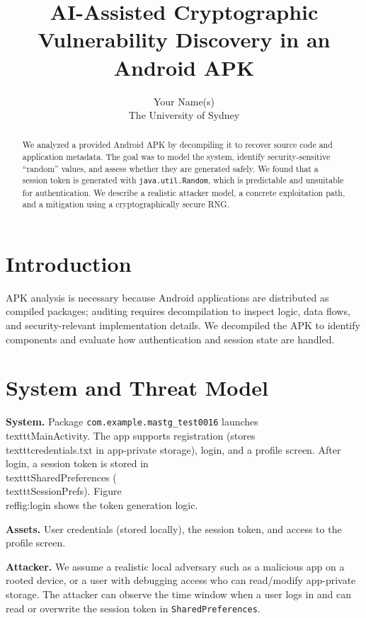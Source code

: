 ﻿\documentclass[letterpaper,twocolumn,10pt]{article}
\title{AI-Assisted Cryptographic Vulnerability Discovery in an Android APK}
\author{
{\rm Your Name(s)}\\
The University of Sydney
}
\date{}
\begin{document}
\maketitle

\begin{abstract}
We analyzed a provided Android APK by decompiling it to recover source code and application metadata. The goal was to model the system, identify security-sensitive ``random'' values, and assess whether they are generated safely. We found that a session token is generated with \texttt{java.util.Random}, which is predictable and unsuitable for authentication. We describe a realistic attacker model, a concrete exploitation path, and a mitigation using a cryptographically secure RNG.
\end{abstract}

\section{Introduction}
APK analysis is necessary because Android applications are distributed as compiled packages; auditing requires decompilation to inspect logic, data flows, and security-relevant implementation details. We decompiled the APK to identify components and evaluate how authentication and session state are handled.

\section{System and Threat Model}
\textbf{System.} Package \texttt{com.example.\allowbreak mastg\_test0016} launches \\texttt{MainActivity}. The app supports registration (stores \\texttt{credentials.txt} in app-private storage), login, and a profile screen. After login, a session token is stored in \\texttt{SharedPreferences} (\\texttt{SessionPrefs}). Figure~\\ref{fig:login} shows the token generation logic.

\textbf{Assets.} User credentials (stored locally), the session token, and access to the profile screen.

\textbf{Attacker.} We assume a realistic local adversary such as a malicious app on a rooted device, or a user with debugging access who can read/modify app-private storage. The attacker can observe the time window when a user logs in and can read or overwrite the session token in \texttt{SharedPreferences}.
\end{document}
